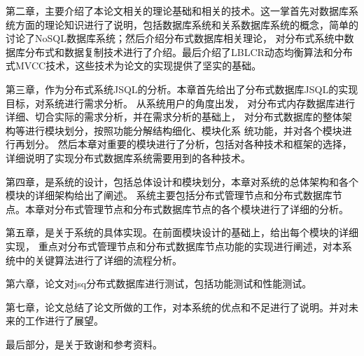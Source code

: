 第二章，主要介绍了本论文相关的理论基础和相关的技术。这一掌首先对数据库系统方面的理论知识进行了说明，包括数据库系统和关系数据库系统的概念，简单的讨论了NoSQL数据库系统；然后介绍分布式数据库相关理论，
对分布式系统中数据库分布式和数据复制技术进行了介绍。最后介绍了LBLCR动态均衡算法和分布式MVCC技术，这些技术为论文的实现提供了坚实的基础。

第三章，作为分布式系统JSQL的分析。本章首先给出了分布式数据库JSQL的实现目标，对系统进行需求分析。
从系统用户的角度出发，
对分布式内存数据库进行详细、切合实际的需求分析，并在需求分析的基础上，
对分布式数据库的整体架构等进行模块划分，按照功能分解结构细化、模块化系
统功能，并对各个模块进行再划分。
然后本章对重要的模块进行了分析，包括对各种技术和框架的选择，详细说明了实现分布式数据库系统需要用到的各种技术。

第四章，是系统的设计，包括总体设计和模块划分，本章对系统的总体架构和各个模块的详细架构给出了阐述。
系统主要包括分布式管理节点和分布式数据库节点。本章对分布式管理节点和分布式数据库节点的各个模块进行了详细的分析。

第五章，是关于系统的具体实现。在前面模块设计的基础上，给出每个模块的详细实现，
重点对分布式管理节点和分布式数据库节点功能的实现进行阐述，对本系统中的关键算法进行了详细的流程分析。

第六章，论文对jsq分布式数据库进行测试，包括功能测试和性能测试。

第七章，论文总结了论文所做的工作，对本系统的优点和不足进行了说明。并对未来的工作进行了展望。

最后部分，是关于致谢和参考资料。